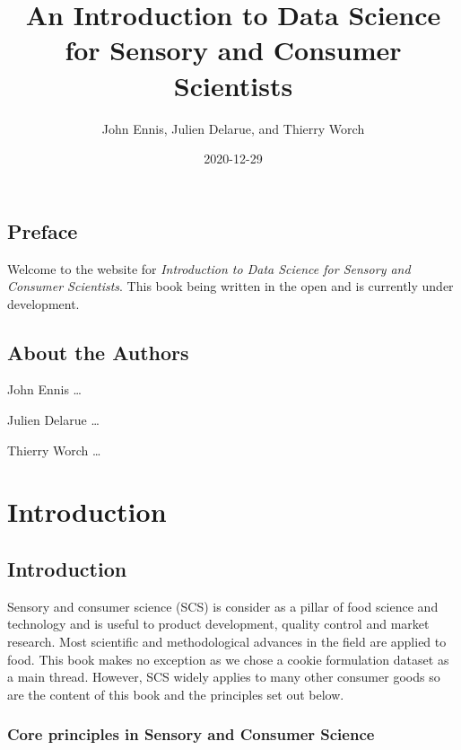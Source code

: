 \documentclass[
]{book}
\title{An Introduction to Data Science for Sensory and Consumer Scientists}
\author{John Ennis, Julien Delarue, and Thierry Worch}
\date{2020-12-29}
\begin{document}
\maketitle

{
\setcounter{tocdepth}{1}
\tableofcontents
}
\hypertarget{preface}{%
\chapter*{Preface}\label{preface}}

Welcome to the website for \emph{Introduction to Data Science for Sensory and Consumer Scientists}. This book being written in the open and is currently under development.

\hypertarget{about-the-authors}{%
\chapter*{About the Authors}\label{about-the-authors}}

John Ennis \ldots{}

Julien Delarue \ldots{}

Thierry Worch \ldots{}

\hypertarget{part-introduction}{%
\part*{Introduction}\label{part-introduction}}

\hypertarget{intro}{%
\chapter{Introduction}\label{intro}}

Sensory and consumer science (SCS) is consider as a pillar of food science and technology and is useful to product development, quality control and market research. Most scientific and methodological advances in the field are applied to food. This book makes no exception as we chose a cookie formulation dataset as a main thread. However, SCS widely applies to many other consumer goods so are the content of this book and the principles set out below.

\hypertarget{core-principles-in-sensory-and-consumer-science}{%
\section{Core principles in Sensory and Consumer Science}\label{core-principles-in-sensory-and-consumer-science}}
\end{document}

